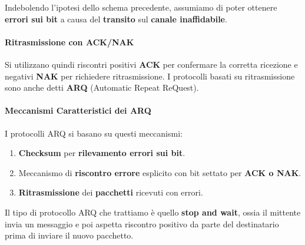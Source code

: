 \documentclass{article}
\begin{document}
Indebolendo l'ipotesi dello schema precedente, assumiamo di poter ottenere \textbf{errori sui bit} a causa del \textbf{transito} sul \textbf{canale inaffidabile}.

\paragraph{Ritrasmissione con ACK/NAK} Si utilizzano quindi riscontri positivi \textbf{ACK} per confermare la corretta ricezione e negativi \textbf{NAK} per richiedere ritrasmissione. I protocolli basati su ritrasmissione sono anche detti \textbf{ARQ} (Automatic Repeat ReQuest).

\paragraph{Meccanismi Caratteristici dei ARQ} I protocolli ARQ si basano su questi meccanismi:

\begin{enumerate}
    \item \textbf{Checksum} per \textbf{rilevamento errori sui bit}.
    \item Meccanismo di \textbf{riscontro errore} esplicito con bit settato per \textbf{ACK o NAK}.
    \item \textbf{Ritrasmissione} dei \textbf{pacchetti} ricevuti con errori.
\end{enumerate}

Il tipo di protocollo ARQ che trattiamo è quello \textbf{stop and wait}, ossia il mittente invia un messaggio e poi aspetta riscontro positivo da parte del destinatario prima di inviare il nuovo pacchetto.
\end{document}
